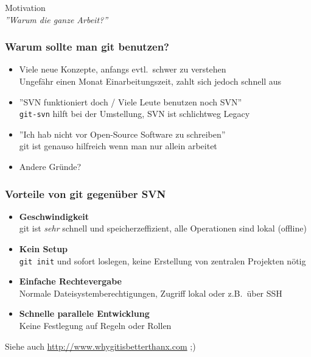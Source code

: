 \begin{frame}
  \begin{center}
  \Huge Motivation \\
  \small {\it ''Warum die ganze Arbeit?''}
  \end{center}
\end{frame}

\begin{frame}
  \frametitle{Warum sollte man git benutzen?}
  \begin{itemize}
    \pause
    \item Viele neue Konzepte, anfangs evtl.\ schwer zu verstehen \\ Ungefähr einen Monat Einarbeitungszeit, zahlt sich jedoch schnell aus
    \pause
    \item ''SVN funktioniert doch / Viele Leute benutzen noch SVN'' \\ {\tt git-svn} hilft bei der Umstellung, SVN ist schlichtweg Legacy
    \pause
    \item ''Ich hab nicht vor Open-Source Software zu schreiben'' \\ git ist genauso hilfreich wenn man nur allein arbeitet
    \pause
    \item Andere Gründe?
  \end{itemize}
\end{frame}

\begin{frame}
  \frametitle{Vorteile von git gegenüber SVN}
  \begin{itemize}
    \pause
    \item {\bf Geschwindigkeit} \\ git ist \emph{sehr} schnell und speicherzeffizient, alle Operationen sind lokal (offline)
    \pause
    \item {\bf Kein Setup} \\ {\tt git init} und sofort loslegen, keine Erstellung von zentralen Projekten nötig
    \pause
    \item {\bf Einfache Rechtevergabe} \\ Normale Dateisystemberechtigungen, Zugriff lokal oder z.B.\ über SSH
    \pause
    \item {\bf Schnelle parallele Entwicklung} \\ Keine Festlegung auf Regeln oder Rollen
  \end{itemize}
  Siehe auch \url{http://www.whygitisbetterthanx.com} ;)
\end{frame}

